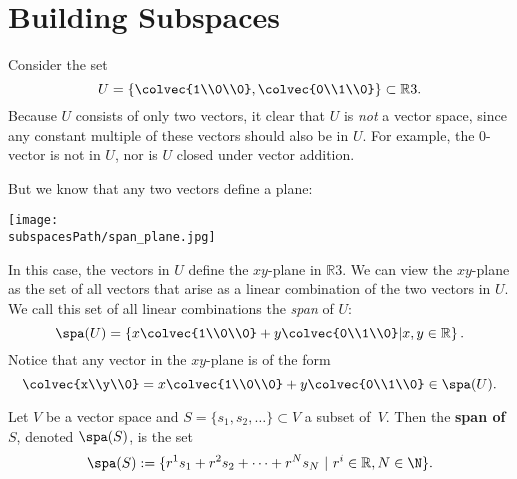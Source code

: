 

\section{Building Subspaces}

Consider the set 
\[
U= \left\{ \colvec{1\\0\\0}, \colvec{0\\1\\0} \right\} \subset \mathbb{R}3.
\]
Because $U$ consists of only two vectors, it clear that $U$ is \emph{not} a vector space, since any constant multiple of these vectors should also be in $U$.  For example, the $0$-vector is not in $U$, nor is $U$ closed under vector addition.

But we know that any two vectors define a plane:
\begin{center}
\texttt{[image: \\subspacesPath/span\_plane.jpg]}
\end{center}
 In this case, the vectors in $U$ define the $xy$-plane in $\mathbb{R}3$.  We can view the $xy$-plane as the set of all vectors that arise as a linear combination of the two vectors in $U$.  We call this set of all linear combinations the \emph{span} of $U$:
\[
\spa(U)=\left\{ x \colvec{1\\0\\0}+y \colvec{0\\1\\0} \middle| x,y\in \mathbb{R}\right\}.
\]
Notice that any vector in the $xy$-plane is of the form
\[
\colvec{x\\y\\0} = x \colvec{1\\0\\0}+y \colvec{0\\1\\0} \in \spa(U).
\]

\begin{definition}
Let $V$ be a vector space and $S=\{ s_1, s_2, \ldots \} \subset V$ a subset of~$V$.  Then the {\bfseries span of $S$}, denoted $\spa(S)$, is the set
\[
\spa(S):=\{ r^1s_1+r^2s_2+\cdots + r^Ns_N ~|~ r^i\in \mathbb{R}, N\in \N \}.
\]
\end{definition}

